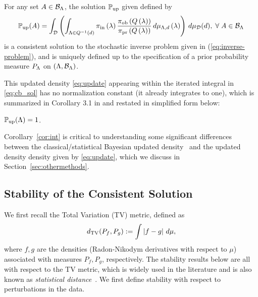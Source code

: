 %

\begin{thm}
For any set $A\in \mathcal{B}_{{\Lambda}}$, the solution $\operatorname*{\mathbb{P}_{up}}$ given defined by
\begin{equation}\label{eq:cb_sol}
\operatorname*{\mathbb{P}_{up}} (A) = \int_{\mathcal{D}} \left (  \int_{{\Lambda} \in Q^{-1}(d)}  \operatorname*{\pi_{in}}\left ( \lambda \right ) \frac{\operatorname*{\pi_{ob}}\left ( Q\left ( \lambda \right ) \right )}{\operatorname*{\pi_{pr}}\left ( Q\left ( \lambda \right ) \right )} \, d\mu_{{\Lambda}, d} \left ( \lambda \right ) \right ) \, d\mu_{\mathcal{D}}(d), \; \forall \; A \in \mathcal{B}_{{\Lambda}}
\end{equation} 
is a consistent solution to the stochastic inverse problem given in (\ref{eq:inverse-problem}), and is uniquely defined up to the specification of a prior probability measure $P_{\Lambda}$ on $({\Lambda}, \mathcal{B}_{{\Lambda}})$.
\end{thm}

This updated density \eqref{eq:update} appearing within the iterated integral in \eqref{eq:cb_sol} has no normalization constant (it already integrates to one), which is summarized in Corollary 3.1 in \cite{BJW18} and restated in simplified form below:
\begin{cor}\label{cor:int}
$\operatorname*{\mathbb{P}_{up}}({\Lambda}) = 1$.
\end{cor}

Corollary~\ref{cor:int} is critical to understanding some significant differences between the classical/statistical Bayesian updated density~\cite{Smith} and the updated density density given by \eqref{eq:update}, which we discuss in Section~\ref{sec:othermethods}.



\subsection{Stability of the Consistent Solution}\label{sec:stability}
We first recall the Total Variation (TV) metric, defined as 
\begin{equation}\label{eq:tv}
d_{\text{TV}} (P_f, P_g) := \int \left\vert f - g\right\vert \, d\mu,
\end{equation}
where $f,g$ are the densities (Radon-Nikodym derivatives with respect to $\mu$) associated with measures $P_f, P_g$, respectively.
The stability results below are all with respect to the TV metric, which is widely used in the literature and is also known as \emph{statistical distance}~\cite{GS02, Smith, Silverman}.
We first define stability with respect to perturbations in the data.

